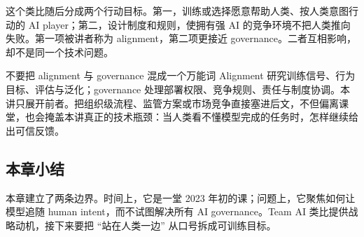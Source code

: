 这个类比随后分成两个行动目标。第一，训练或选择愿意帮助人类、按人类意图行动的 AI player；第二，设计制度和规则，使拥有强 AI 的竞争环境不把人类推向失败。第一项被讲者称为 alignment，第二项更接近 governance。二者互相影响，却不是同一个技术问题。


\begin{warningbox}{不要把 alignment 与 governance 混成一个万能词}
Alignment 研究训练信号、行为目标、评估与泛化；governance 处理部署权限、竞争规则、责任与制度协调。本讲只展开前者。把组织级流程、监管方案或市场竞争直接塞进后文，不但偏离课堂，也会掩盖本讲真正的技术瓶颈：当人类看不懂模型完成的任务时，怎样继续给出可信反馈。
\end{warningbox}

\subsection{本章小结}

本章建立了两条边界。时间上，它是一堂 2023 年初的课；问题上，它聚焦如何让模型追随 human intent，而不试图解决所有 AI governance。Team AI 类比提供战略动机，接下来要把 ``站在人类一边'' 从口号拆成可训练目标。

